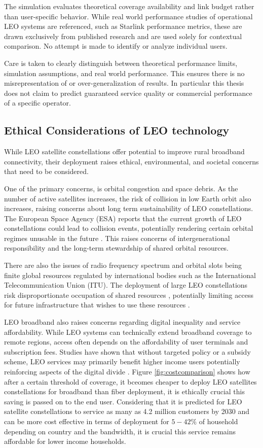 The simulation evaluates theoretical coverage availability and link budget rather than user-specific behavior. While real world performance studies of operational LEO systems are referenced, such as Starlink performance metrics, these are drawn exclusively from published research and are used solely for contextual comparison. No attempt is made to identify or analyze individual users. 

Care is taken to clearly distinguish between theoretical performance limits, simulation assumptions, and real world performance. This ensures there is no misrepresentation of or over-generalization of results. In particular this thesis does not claim to predict guaranteed service quality or commercial performance of a specific operator. 

\subsection{Ethical Considerations of LEO technology}
While LEO satellite constellations offer potential to improve rural broadband connectivity, their deployment raises ethical, environmental, and societal concerns that need to be considered. 

One of the primary concerns, is orbital congestion and space debris. As the number of active satellites increases, the risk of collision in low Earth orbit also increases, raising concerns about long term sustainability of LEO constellations. The European Space Agency (ESA) reports that the current growth of LEO constellations could lead to collision events, potentially rendering certain orbital regimes unusable in the future \cite{ESA_SpaceDebris}. This raises concerns of intergenerational responsibility and the long-term stewardship of shared orbital resources. 

There are also the issues of radio frequency spectrum and orbital slots being finite global resources regulated by international bodies such as the International Telecommunication Union (ITU). The deployment of large LEO constellations risk disproportionate occupation of shared resources , potentially limiting access for future infrastructure that wishes to use these resources \cite{ITU_R_Space}. 

LEO broadband also raises concerns regarding digital inequality and service affordability. While LEO systems can technically extend broadband coverage to remote regions, access often depends on the affordability of user terminals and subscription fees. Studies have shown that without targeted policy or a subsidy scheme, LEO services may primarily benefit higher income users potentially reinforcing aspects of the digital divide \cite{AnalysysMasonLEO2024}. Figure \ref{fig:costcomparison} shows how after a certain threshold of coverage, it bceomes cheaper to deploy LEO satellites constellations for broadband than fiber deployment, it is ethically crucial this saving is passed on to the end user. Considering that it is predicted for LEO satellite constellations to service as many as 4.2 million customers by 2030 and can be more cost effective in terms of deployment for $5-42\%$ of household depending on country and the bandwidth, it is crucial this service remains affordable for lower income households.

